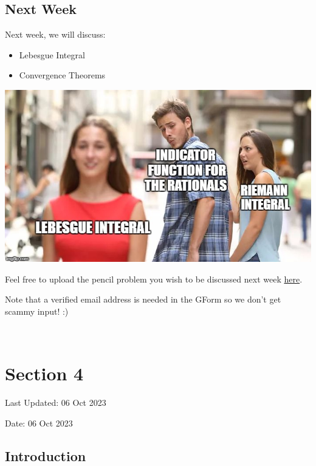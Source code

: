 \documentclass[
  letterpaper,
  DIV=11,
  numbers=noendperiod]{scrreprt}
\providecommand{\tightlist}{%
  \setlength{\itemsep}{0pt}\setlength{\parskip}{0pt}}\usepackage{longtable,booktabs,array}
\theoremstyle{plain}
\theoremstyle{definition}
\theoremstyle{remark}
\begin{document}
\hypertarget{next-week-2}{%
\section*{Next Week}\label{next-week-2}}


Next week, we will discuss:

\begin{itemize}
\tightlist
\item
  Lebesgue Integral
\item
  Convergence Theorems
\end{itemize}

\includegraphics{./assets/img/lebesgue.jpeg}

Feel free to upload the pencil problem you wish to be discussed next
week \href{https://forms.gle/RBmMNYJp4u3qD5W79}{here}.

Note that a verified email address is needed in the GForm so we don't
get scammy input! :)

\(\,\)


\hypertarget{section-4}{%
\chapter*{Section 4}\label{section-4}}


Last Updated: 06 Oct 2023

Date: 06 Oct 2023

\hypertarget{introduction-3}{%
\section*{Introduction}\label{introduction-3}}
\end{document}
